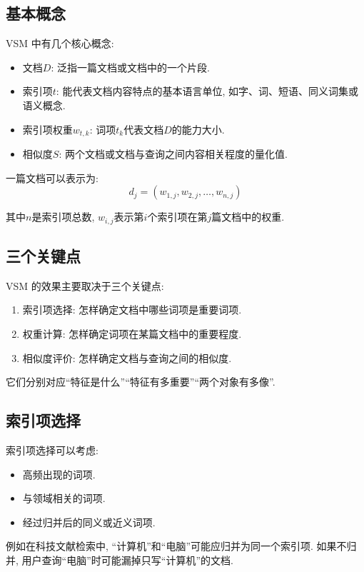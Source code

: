 \subsection{基本概念}


VSM 中有几个核心概念:

\begin{itemize}
\item 文档$D$: 泛指一篇文档或文档中的一个片段.
\item 索引项$t$: 能代表文档内容特点的基本语言单位, 如字、词、短语、同义词集或语义概念.
\item 索引项权重$w_{t,k}$: 词项$t_k$代表文档$D$的能力大小.
\item 相似度$S$: 两个文档或文档与查询之间内容相关程度的量化值.
\end{itemize}

一篇文档可以表示为:
\[
d_j = (w_{1,j}, w_{2,j}, \dots, w_{n,j})
\]

其中$n$是索引项总数, $w_{i,j}$表示第$i$个索引项在第$j$篇文档中的权重.

\subsection{三个关键点}


VSM 的效果主要取决于三个关键点:

\begin{enumerate}
\item[1.] 索引项选择: 怎样确定文档中哪些词项是重要词项.
\item[2.] 权重计算: 怎样确定词项在某篇文档中的重要程度.
\item[3.] 相似度评价: 怎样确定文档与查询之间的相似度.
\end{enumerate}

它们分别对应“特征是什么”“特征有多重要”“两个对象有多像”.

\subsection{索引项选择}


索引项选择可以考虑:

\begin{itemize}
\item 高频出现的词项.
\item 与领域相关的词项.
\item 经过归并后的同义或近义词项.
\end{itemize}

例如在科技文献检索中, “计算机”和“电脑”可能应归并为同一个索引项.
如果不归并, 用户查询“电脑”时可能漏掉只写“计算机”的文档.

